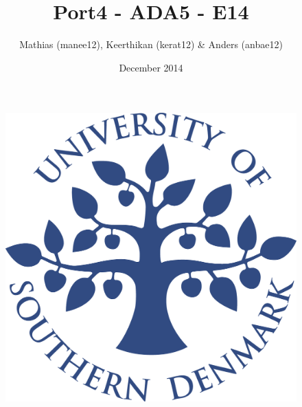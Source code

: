 \title{Port4 - ADA5 - E14}
\author{Mathias (manee12), Keerthikan (kerat12) \& Anders (anbae12)}
\date{December 2014}
\begin{figure}
\centering
\includegraphics[width=1\textwidth]{graphics/forside.png}
\end{figure}
\maketitle